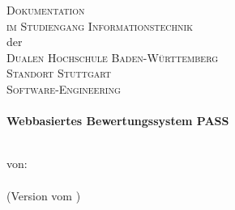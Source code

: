 
\begin{titlepage}
	
	\begin{center}
		
		\textsc{\LARGE Dokumentation}\\[2cm]
		\textsc{\large im Studiengang Informationstechnik}\\
		der\\
		\textsc{\large Dualen Hochschule Baden-Württemberg}\\
		\textsc{\large Standort Stuttgart}\\
		\textsc{\large Software-Engineering}\\[3.2cm]
		

		\HRule \\[0.4cm]
		{\huge \bfseries Webbasiertes Bewertungssystem PASS}\\[0.4cm]
		\HRule \\[0.1cm]
		\author{\vhListAllAuthors}
		\large von:\\ \textsc{\sLong}\\[0.2cm]
		(Version \vhCurrentVersion\hspace{0.1cm} vom \vhCurrentDate)
		\vspace{10.0cm}
			
	\end{center}

\end{titlepage}